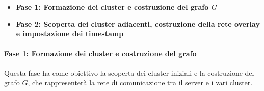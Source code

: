 \documentclass[12pt, a4paper]{report}
\begin{document}
\begin{itemize}
    \item \textbf{Fase 1: Formazione dei cluster e costruzione del grafo $G$}
    \item \textbf{Fase 2: Scoperta dei cluster adiacenti, costruzione della rete overlay e impostazione dei timestamp}
\end{itemize}

\paragraph{Fase 1: Formazione dei cluster e costruzione del grafo}
Questa fase ha come obiettivo la scoperta dei cluster iniziali e la costruzione del grafo $G$, che rappresenter\`a la rete di comunicazione tra il server e i vari cluster.
\end{document}
